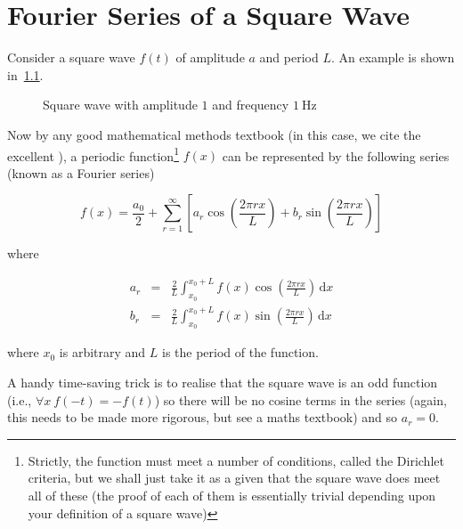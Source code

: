 \chapter{Fourier Series of a Square Wave}
\label{sec:squareWaveFourierSeries}

Consider a square wave $f(t)$ of amplitude $a$ and period $L$. An example is
shown in~\cref{fig:squareWave}.

\begin{figure}[h]
  \caption{Square wave with amplitude $1$ and frequency $\SI{1}{\Hz}$}
  \label{fig:squareWave}
\end{figure}

Now by any good mathematical methods textbook (in this case, we cite the
excellent \textcite{FourierSeries}), a periodic function\footnote{Strictly, the
  function must meet a number of conditions, called the Dirichlet criteria, but
we shall just take it as a given that the square wave does meet all of these
(the proof of each of them is essentially trivial depending upon your definition
of a square wave)} $f(x)$ can be represented by the following series (known as a
Fourier series)

\begin{equation*}
  f(x) = \frac{a_0}{2} + \sum_{r=1}^{\infty} \left[ a_r\cos\left(\frac{2\pi rx}{L}\right) + b_r\sin\left(\frac{2\pi rx}{L}\right)\right]
\end{equation*}

where

\begin{eqnarray*}
  a_r &=& \frac{2}{L} \int_{x_0}^{x_0+L} f(x)\cos\left(\frac{2\pi rx}{L}\right)\,\mathrm{d}x\\
  b_r &=& \frac{2}{L} \int_{x_0}^{x_0+L} f(x)\sin\left(\frac{2\pi rx}{L}\right)\,\mathrm{d}x
\end{eqnarray*}

where $x_0$ is arbitrary and $L$ is the period of the function.

A handy time-saving trick is to realise that the square wave is an odd function
(i.e., $\forall x\: f(-t)=-f(t)$) so there will be no cosine terms in the series
(again, this needs to be made more rigorous, but see a maths textbook) and so
$a_r=0$.

